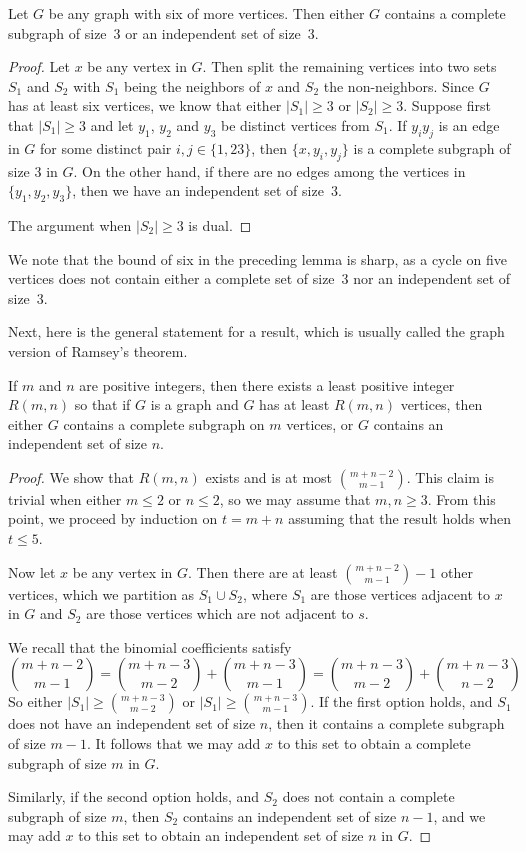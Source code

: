 \begin{lemma}\label{lem:r33}
Let $G$ be any graph with six of more vertices.
Then either $G$ contains a complete subgraph of size~$3$ or
an independent set of size~$3$.
\end{lemma}
\begin{proof}
Let $x$ be any vertex in $G$.  Then 
split the remaining vertices into two sets
$S_1$ and $S_2$ with $S_1$ being the neighbors of
$x$ and $S_2$ the non-neighbors.  Since $G$ has
at least six vertices, we know that either $|S_1|\ge 3$
or $|S_2|\ge 3$.  Suppose first that $|S_1|\ge 3$ and
let $y_1$, $y_2$ and $y_3$ be distinct vertices from
$S_1$.  If $y_iy_j$ is an edge in $G$ for some distinct
pair $i, j\in\{1,23\}$, then $\{x,y_i,y_j\}$ is a complete
subgraph of size $3$ in $G$.  On the other hand, if
there are no edges among the vertices in $\{y_1,y_2,y_3\}$,
then we have an independent set of size~$3$.

The argument when $|S_2|\ge3$ is dual.
\end{proof} 
We note that the bound of six in the preceding lemma is sharp,
as a cycle on five vertices does not contain either a complete
set of size~$3$ nor an independent set of size~$3$.

Next, here is the general statement for a result, which is
usually called the graph version of Ramsey's theorem.

\begin{theorem}\label{thm:graphramsey}
If $m$ and $n$ are positive integers, then there exists
a least positive integer $R(m,n)$ so that if $G$ is a graph
and $G$ has at least $R(m,n)$ vertices, then either $G$ contains
a complete subgraph on $m$ vertices, or $G$ contains an
independent set of size $n$.
\end{theorem}
\begin{proof}
We show that $R(m,n)$ exists and is at most $\binom{m+n-2}{m-1}$.
This claim is trivial when either $m\le 2$ or $n\le2$, so we
may assume that $m,n\ge3$.  From this point, we proceed by induction
on $t=m+n$ assuming that the result holds when $t\le 5$.

Now let $x$ be any vertex in $G$.  Then there are at least
$\binom{m+n-2}{m-1}-1$ other vertices, which we partition
as $S_1\cup S_2$, where $S_1$ are those vertices adjacent to $x$
in $G$ and $S_2$ are those vertices which are not adjacent to
$s$.

We recall that the binomial coefficients satisfy
\[
\binom{m+n-2}{m-1}=\binom{m+n-3}{m-2}+\binom{m+n-3}{m-1} =
\binom{m+n-3}{m-2}+\binom{m+n-3}{n-2}
\]
So either $|S_1|\ge \binom{m+n-3}{m-2}$ or $|S_1|\ge\binom{m+n-3}{m-1}$.
If the first option holds, and $S_1$ does not have an independent set
of size $n$, then it contains a complete subgraph of size $m-1$.  It follows
that we may add $x$ to this set to obtain a complete subgraph of size $m$
in $G$.

Similarly, if the second option holds, and $S_2$ does not contain a
complete subgraph of size $m$, then $S_2$ contains an independent
set of size $n-1$, and we may add $x$ to this set to obtain an
independent set of size $n$ in $G$.
\end{proof} 

